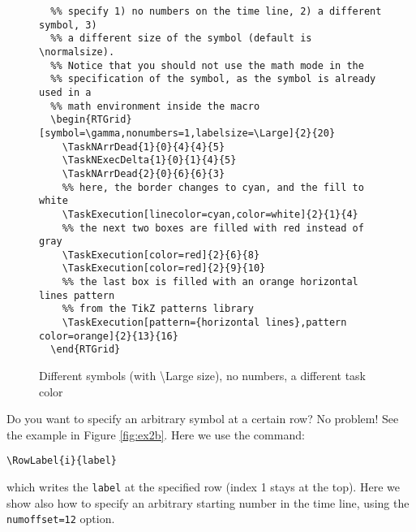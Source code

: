 \documentclass{article}
\begin{document}
\begin{figure}[!htbp]
  \centering
  \begin{RTGrid}[width=8cm,symbol=\gamma,nonumbers=1,labelsize=\small]{2}{20}
  \end{RTGrid}

\begin{verbatim}
  %% specify 1) no numbers on the time line, 2) a different symbol, 3)
  %% a different size of the symbol (default is \normalsize).
  %% Notice that you should not use the math mode in the
  %% specification of the symbol, as the symbol is already used in a
  %% math environment inside the macro
  \begin{RTGrid}[symbol=\gamma,nonumbers=1,labelsize=\Large]{2}{20}
    \TaskNArrDead{1}{0}{4}{4}{5}    
    \TaskNExecDelta{1}{0}{1}{4}{5}
    \TaskNArrDead{2}{0}{6}{6}{3}  
    %% here, the border changes to cyan, and the fill to white
    \TaskExecution[linecolor=cyan,color=white]{2}{1}{4}
    %% the next two boxes are filled with red instead of gray
    \TaskExecution[color=red]{2}{6}{8}
    \TaskExecution[color=red]{2}{9}{10}
    %% the last box is filled with an orange horizontal lines pattern
    %% from the TikZ patterns library
    \TaskExecution[pattern={horizontal lines},pattern color=orange]{2}{13}{16}        
  \end{RTGrid}
\end{verbatim}
  \caption{Different symbols (with \textbackslash Large size), no numbers, a different
    task color}
  \label{fig:ex2a}
\end{figure}

Do you want to specify an arbitrary symbol at a certain row?
No problem! See the example in Figure \ref{fig:ex2b}. Here we use the command:
\begin{verbatim}
\RowLabel{i}{label}
\end{verbatim}
which writes the \texttt{label} at the specified row (index 1 stays at
the top). Here we show also how to specify an arbitrary starting
number in the time line, using the \texttt{numoffset=12} option.
\end{document}
